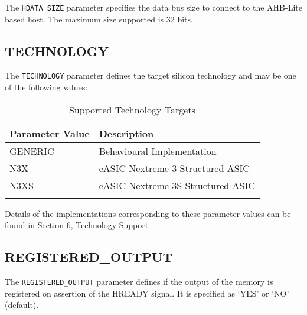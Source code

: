 The \texttt{HDATA\_SIZE} parameter specifies the data bus size to connect to 
the AHB-Lite based host. The maximum size supported is 32 bits.

 \subsection{TECHNOLOGY}\label{technology}

The \texttt{TECHNOLOGY} parameter defines the target silicon technology and 
may be one of the following values:

\begin{longtable}[]{@{}ll@{}}
	\toprule
	Parameter Value & Description\tabularnewline
	\midrule
	\endhead
	GENERIC & Behavioural Implementation\tabularnewline
	N3X & eASIC Nextreme-3 Structured ASIC\tabularnewline
	N3XS & eASIC Nextreme-3S Structured ASIC\tabularnewline
	\bottomrule
	\caption{Supported Technology Targets}
\end{longtable}

Details of the implementations corresponding to these parameter values can be found in Section 6, Technology Support

 \subsection{REGISTERED\_OUTPUT}\label{registered_output}

The \texttt{REGISTERED\_OUTPUT} parameter defines if the output of the memory 
is registered on assertion of the HREADY signal. It is specified as 
`YES' or `NO' (default).
